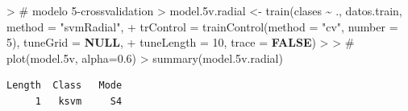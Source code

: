 \documentclass[
]{article}
\newenvironment{Shaded}{\begin{snugshade}}{\end{snugshade}}
\newcommand{\AttributeTok}[1]{\textcolor[rgb]{0.80,0.80,0.80}{#1}}
\newcommand{\CommentTok}[1]{\textcolor[rgb]{0.50,0.62,0.50}{#1}}
\newcommand{\ConstantTok}[1]{\textcolor[rgb]{0.86,0.64,0.64}{\textbf{#1}}}
\newcommand{\DecValTok}[1]{\textcolor[rgb]{0.86,0.86,0.80}{#1}}
\newcommand{\ErrorTok}[1]{\textcolor[rgb]{0.76,0.75,0.62}{#1}}
\newcommand{\FloatTok}[1]{\textcolor[rgb]{0.75,0.75,0.82}{#1}}
\newcommand{\FunctionTok}[1]{\textcolor[rgb]{0.94,0.94,0.56}{#1}}
\newcommand{\NormalTok}[1]{\textcolor[rgb]{0.80,0.80,0.80}{#1}}
\newcommand{\OtherTok}[1]{\textcolor[rgb]{0.94,0.94,0.56}{#1}}
\newcommand{\SpecialCharTok}[1]{\textcolor[rgb]{0.86,0.64,0.64}{#1}}
\newcommand{\StringTok}[1]{\textcolor[rgb]{0.80,0.58,0.58}{#1}}
\begin{document}
\begin{Shaded}
\begin{Highlighting}[]
\SpecialCharTok{\textgreater{}} \CommentTok{\# modelo 5{-}crossvalidation}
\ErrorTok{\textgreater{}}\NormalTok{ model}\FloatTok{.5}\NormalTok{v.radial }\OtherTok{\textless{}{-}} \FunctionTok{train}\NormalTok{(clases }\SpecialCharTok{\textasciitilde{}}\NormalTok{ ., datos.train, }\AttributeTok{method =} \StringTok{"svmRadial"}\NormalTok{,}
\SpecialCharTok{+}     \AttributeTok{trControl =} \FunctionTok{trainControl}\NormalTok{(}\AttributeTok{method =} \StringTok{"cv"}\NormalTok{, }\AttributeTok{number =} \DecValTok{5}\NormalTok{), }\AttributeTok{tuneGrid =} \ConstantTok{NULL}\NormalTok{,}
\SpecialCharTok{+}     \AttributeTok{tuneLength =} \DecValTok{10}\NormalTok{, }\AttributeTok{trace =} \ConstantTok{FALSE}\NormalTok{)}
\SpecialCharTok{\textgreater{}} 
\ErrorTok{\textgreater{}} \CommentTok{\# plot(model.5v, alpha=0.6)}
\ErrorTok{\textgreater{}} \FunctionTok{summary}\NormalTok{(model}\FloatTok{.5}\NormalTok{v.radial)}
\end{Highlighting}
\end{Shaded}

\begin{verbatim}
Length  Class   Mode 
     1   ksvm     S4 
\end{verbatim}

\begin{Shaded}
\end{Shaded}
\end{document}
